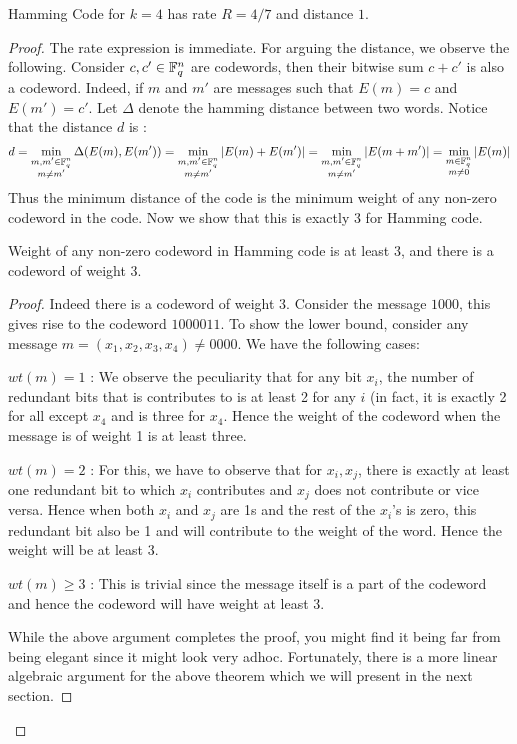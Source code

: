 \begin{proposition}
Hamming Code for $k=4$ has rate $R = 4/7$ and distance $1$.
\end{proposition}
\begin{proof}
The rate expression is immediate. For arguing the distance, we observe the following. Consider $c, c' \in {\mathbb{F}}_q^n$ are codewords, then their bitwise sum $c+c'$ is also a codeword. Indeed, if $m$ and $m'$ are messages such that $E(m) = c$ and $E(m') = c'$. Let $\Delta$ denote the hamming distance between two words. Notice that the distance $d$ is :
\[
d = \min_{\substack{m,m' \in {\mathbb{F}}_q^n \\ m \ne m'}}\Delta(E(m),E(m')) = \min_{\substack{m,m' \in {\mathbb{F}}_q^n \\ m \ne m'}}|E(m)+E(m')|= \min_{\substack{m,m' \in {\mathbb{F}}_q^n \\ m \ne m'}}|E(m+m')| = \min_{\substack{m \in {\mathbb{F}}_q^n \\ m \ne 0}}|E(m)| \\
\]
Thus the minimum distance of the code is the minimum weight of any non-zero codeword in the code. Now we show that this is exactly 3 for Hamming code. 
\begin{claim}
Weight of any non-zero codeword in Hamming code is at least $3$, and there is a codeword of weight $3$.
\end{claim}
\begin{proof}
Indeed there is a codeword of weight 3. Consider the message $1000$, this gives rise to the codeword $1000011$. To show the lower bound, consider any message $m = (x_1,x_2,x_3,x_4) \ne 0000$. We have the following cases:
\begin{description}
\item{$wt(m) = 1$ :} We observe the peculiarity that for any bit $x_i$, the number of redundant bits that is contributes to is at least 2 for any $i$ (in fact, it is exactly 2 for all except $x_4$ and is three for $x_4$. Hence the weight of the codeword when the message is of weight 1 is at least three.
\item{$wt(m) = 2$ :} For this, we have to observe that for $x_i, x_j$, there is exactly at least one redundant bit to which $x_i$ contributes and $x_j$ does not contribute or vice versa. Hence when both $x_i$ and $x_j$ are 1s and the rest of the $x_i$'s is zero, this redundant bit also be 1 and will contribute to the weight of the word. Hence the weight will be at least 3.
\item{$wt(m) \ge 3$ :} This is trivial since the message itself is a part of the codeword and hence the codeword will have weight at least $3$.
\end{description}
While the above argument completes the proof, you might find it being far from being elegant since it might look very adhoc. Fortunately, there is a more linear algebraic argument for the above theorem which we will present in the next section.
\end{proof}
\end{proof}

